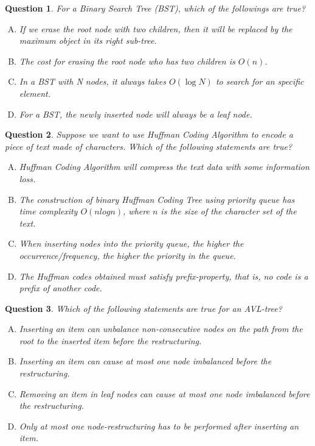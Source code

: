 \documentclass[10.5pt]{article}
\newtheorem{Q}{Question}
\begin{document}
\begin{Q}
	For a Binary Search Tree (BST), which of the followings are true?
	
	\begin{enumerate}[(A)]
		\item If we erase the root node with two children, then it will be replaced by the maximum object in its right sub-tree.
		\item The cost for erasing the root node who has two children is $O(n)$. 
		\item In a BST with N nodes, it always takes $O(\log N)$ to search for an specific element.
		\item For a BST, the newly inserted node will always be a leaf node.
	\end{enumerate}
\end{Q}


\begin{Q}
	Suppose we want to use Huffman Coding Algorithm to encode a piece of text made of characters. Which of the following statements are true?
	\begin{enumerate}[(A)]
		\item Huffman Coding Algorithm will  compress the text data with some information loss.
		\item The construction of binary Huffman Coding Tree using priority queue has time complexity $O(nlogn)$, where $n$ is the size of the character set of the text.
		\item When inserting nodes into the priority queue, the higher the occurrence/frequency, the higher the priority in the queue.
		\item The Huffman codes obtained must satisfy prefix-property, that is, no code is a prefix of another code.
	\end{enumerate}
\end{Q}

	\begin{Q}
		Which of the following statements are true for an AVL-tree?
		\begin{enumerate}[(A)]
			\item Inserting an item can unbalance non-consecutive nodes on the path from the root to the inserted item before the restructuring.
			\item Inserting an item can cause at most one node imbalanced before the restructuring.
			\item Removing an item in leaf nodes can cause at most one node imbalanced before the restructuring.
			\item Only at most one node-restructuring has to be performed after inserting an item.
		\end{enumerate}
	\end{Q}
	
\end{document}
